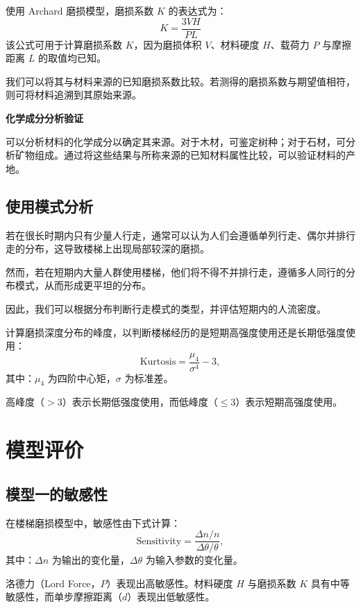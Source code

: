 \documentclass[11pt,a4paper]{ctexart}
\begin{document}
使用 Archard 磨损模型，磨损系数 $K$ 的表达式为：
\begin{equation}
K=\frac{3VH}{PL} \tag{40}
\end{equation}
该公式可用于计算磨损系数 $K$，因为磨损体积 $V$、材料硬度 $H$、载荷力 $P$ 与摩擦距离 $L$ 的取值均已知。

我们可以将其与材料来源的已知磨损系数比较。若测得的磨损系数与期望值相符，则可将材料追溯到其原始来源。

\textbf{化学成分分析验证}

可以分析材料的化学成分以确定其来源。对于木材，可鉴定树种；对于石材，可分析矿物组成。通过将这些结果与所称来源的已知材料属性比较，可以验证材料的产地。

\subsection{使用模式分析}

若在很长时期内只有少量人行走，通常可以认为人们会遵循单列行走、偶尔并排行走的分布，这导致楼梯上出现局部较深的磨损。

然而，若在短期内大量人群使用楼梯，他们将不得不并排行走，遵循多人同行的分布模式，从而形成更平坦的分布。

因此，我们可以根据分布判断行走模式的类型，并评估短期内的人流密度。

计算磨损深度分布的峰度，以判断楼梯经历的是短期高强度使用还是长期低强度使用：
\begin{equation}
\text{Kurtosis}=\frac{\mu_4}{\sigma^4}-3, \tag{41}
\end{equation}
其中：$\mu_4$ 为四阶中心矩，$\sigma$ 为标准差。

高峰度（$>3$）表示长期低强度使用，而低峰度（$\le 3$）表示短期高强度使用。

\section{模型评价}

\subsection{模型一的敏感性}

在楼梯磨损模型中，敏感性由下式计算：
\begin{equation}
\text{Sensitivity}=\frac{\Delta n/n}{\Delta\theta/\theta}, \tag{42}
\end{equation}
其中：$\Delta n$ 为输出的变化量，$\Delta\theta$ 为输入参数的变化量。

洛德力（Lord Force，$P$）表现出高敏感性。材料硬度 $H$ 与磨损系数 $K$ 具有中等敏感性，而单步摩擦距离（$d$）表现出低敏感性。
\end{document}
